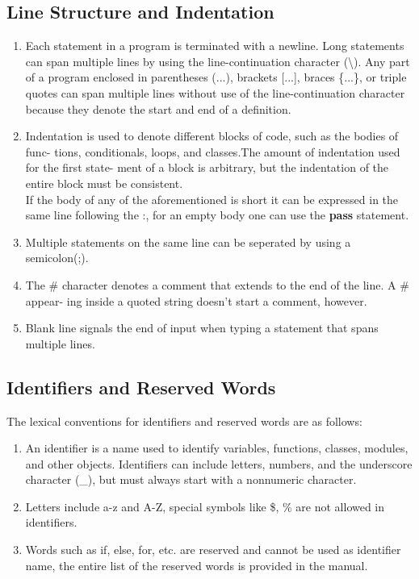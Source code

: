 \documentclass[12pt]{article}
\begin{document}
\subsection{Line Structure and Indentation}
\begin{enumerate}
\item Each statement in a program is terminated with a newline. Long statements can span
multiple lines by using the line-continuation character (\textbackslash). Any part of a program enclosed in parentheses (...), brackets [...], braces \{...\}, or triple quotes can
span multiple lines without use of the line-continuation character because they denote
the start and end of a definition.
\item Indentation is used to denote different blocks of code, such as the bodies of func-
tions, conditionals, loops, and classes.The amount of indentation used for the first state-
ment of a block is arbitrary, but the indentation of the entire block must be consistent.\\
If the body of any of the aforementioned is short it can be expressed in the same line following the :, for an empty body one can use the \textbf{pass} statement.
\item Multiple statements on the same line can be seperated by using a semicolon(;).
\item The \# character denotes a comment that extends to the end of the line. A \# appear-
ing inside a quoted string doesn’t start a comment, however.
\item  Blank line signals the end of input when typing a statement that
spans multiple lines.
\end{enumerate}
\subsection{Identifiers and Reserved Words}
The lexical conventions for identifiers and reserved words are as follows:
\begin{enumerate}
\item An identifier is a name used to identify variables, functions, classes, modules, and other objects. Identifiers can include letters, numbers, and the underscore character (\_), but must always start with a nonnumeric character.
\item Letters include a-z and A-Z, special symbols like \$, \% are not allowed in identifiers.
\item Words such as if, else, for, etc. are reserved and cannot be used
as identifier name, the entire list of the reserved words is provided in the manual.
\end{enumerate}
\end{document}
